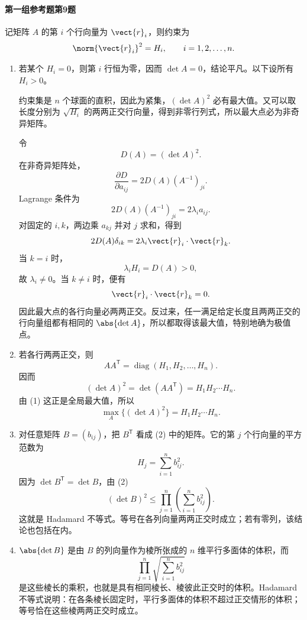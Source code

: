 \paragraph{第一组参考题第9题}
\begin{xsolution}
记矩阵 $A$ 的第 $i$ 个行向量为 $\vect{r}_i$，则约束为
\[
  \norm{\vect{r}_i}^2=H_i,
  \qquad i=1,2,\ldots,n.
\]

\begin{enumerate}[label=(\arabic*)]
  \item 若某个 $H_i=0$，则第 $i$ 行恒为零，因而 $\det A=0$，结论平凡。以下设所有 $H_i>0$。

  约束集是 $n$ 个球面的直积，因此为紧集，$(\det A)^2$ 必有最大值。又可以取长度分别为 $\sqrt{H_i}$ 的两两正交行向量，得到非零行列式，所以最大点必为非奇异矩阵。

  令
  \[
    D(A)=(\det A)^2.
  \]
  在非奇异矩阵处，
  \[
    \frac{\partial D}{\partial a_{ij}}
    =2D(A)(A^{-1})_{ji}.
  \]
  Lagrange 条件为
  \[
    2D(A)(A^{-1})_{ji}=2\lambda_i a_{ij}.
  \]
  对固定的 $i,k$，两边乘 $a_{kj}$ 并对 $j$ 求和，得到
  \[
    2D(A)\delta_{ik}
    =2\lambda_i\vect{r}_i\cdot\vect{r}_k.
  \]
  当 $k=i$ 时，
  \[
    \lambda_iH_i=D(A)>0,
  \]
  故 $\lambda_i\ne0$。当 $k\ne i$ 时，便有
  \[
    \vect{r}_i\cdot\vect{r}_k=0.
  \]
  因此最大点的各行向量必两两正交。反过来，任一满足给定长度且两两正交的行向量组都有相同的 $\abs{\det A}$，所以都取得该最大值，特别地确为极值点。

  \item 若各行两两正交，则
  \[
    AA^{\mathsf T}=\operatorname{diag}(H_1,H_2,\ldots,H_n).
  \]
  因而
  \[
    (\det A)^2
    =\det(AA^{\mathsf T})
    =H_1H_2\cdots H_n.
  \]
  由 (1) 这正是全局最大值，所以
  \[
    \max_A\{(\det A)^2\}=H_1H_2\cdots H_n.
  \]

  \item 对任意矩阵 $B=(b_{ij})$，把 $B^{\mathsf T}$ 看成 (2) 中的矩阵。它的第 $j$ 个行向量的平方范数为
  \[
    H_j=\sum_{i=1}^n b_{ij}^2.
  \]
  因为 $\det B^{\mathsf T}=\det B$，由 (2)
  \[
    (\det B)^2
    \le\prod_{j=1}^n\left(\sum_{i=1}^n b_{ij}^2\right).
  \]
  这就是 Hadamard 不等式。等号在各列向量两两正交时成立；若有零列，该结论也包括在内。

  \item $\abs{\det B}$ 是由 $B$ 的列向量作为棱所张成的 $n$ 维平行多面体的体积，而
  \[
    \prod_{j=1}^n\sqrt{\sum_{i=1}^n b_{ij}^2}
  \]
  是这些棱长的乘积，也就是具有相同棱长、棱彼此正交时的体积。Hadamard 不等式说明：在各条棱长固定时，平行多面体的体积不超过正交情形的体积；等号恰在这些棱两两正交时成立。
\end{enumerate}
\end{xsolution}


